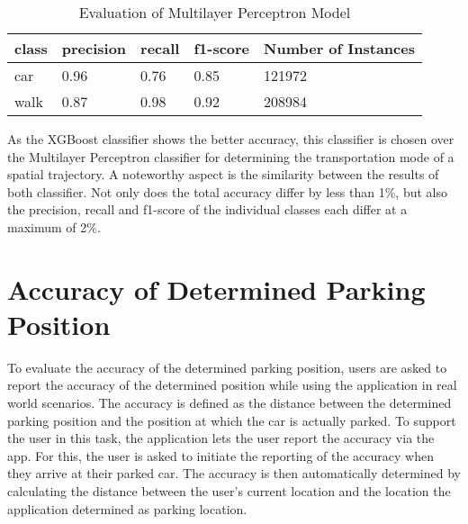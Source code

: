\begin{table}[h!]
    \centering
    \begin{tabular}{|l|l|l|l|l|} \toprule
        class & precision & recall & f1-score & Number of Instances \\ \midrule
        car & 0.96 & 0.76 & 0.85 & 121972 \\
        walk & 0.87 & 0.98 & 0.92 & 208984 \\ \bottomrule 
    \end{tabular}
    \caption{Evaluation of Multilayer Perceptron Model}
    \label{table:mlp_eval}
\end{table}{}

As the XGBoost classifier shows the better accuracy, this classifier is chosen over the Multilayer Perceptron classifier for determining the transportation mode of a spatial trajectory. A noteworthy aspect is the similarity between the results of both classifier. Not only does the total accuracy differ by less than 1\%, but also the precision, recall and f1-score of the individual classes each differ at a maximum of 2\%.
     
\section{Accuracy of Determined Parking Position}

To evaluate the accuracy of the determined parking position, users are asked to report the accuracy of the determined position while using the application in real world scenarios. The accuracy is defined as the distance between the determined parking position and the position at which the car is actually parked. To support the user in this task, the application lets the user report the accuracy via the app. For this, the user is asked to initiate the reporting of the accuracy when they arrive at their parked car. The accuracy is then automatically determined by calculating the distance between the user's current location and the location the application determined as parking location.


